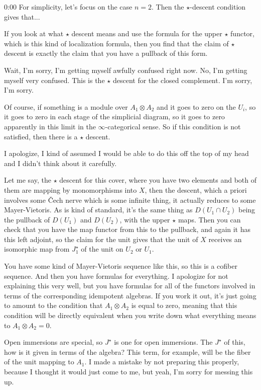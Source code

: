 \begin{unfinished}{0:00}
For simplicity, let's focus on the case $n=2$. Then the $\star$-descent condition gives that...


If you look at what $\star$ descent means and use the formula for the upper $\star$ functor, which is this kind of localization formula, then you find that the claim of $\star$ descent is exactly the claim that you have a pullback of this form.

Wait, I'm sorry, I'm getting myself awfully confused right now. No, I'm getting myself very confused. This is the $\star$ descent for the closed complement. I'm sorry, I'm sorry.

Of course, if something is a module over $A_1 \otimes A_2$ and it goes to zero on the $U_i$, so it goes to zero in each stage of the simplicial diagram, so it goes to zero apparently in this limit in the $\infty$-categorical sense. So if this condition is not satisfied, then there is a $\star$ descent.

I apologize, I kind of assumed I would be able to do this off the top of my head and I didn't think about it carefully. 

Let me say, the $\star$ descent for this cover, where you have two elements and both of them are mapping by monomorphisms into $X$, then the descent, which a priori involves some Čech nerve which is some infinite thing, it actually reduces to some Mayer-Vietoris. As is kind of standard, it's the same thing as $D(U_1 \cap U_2)$ being the pullback of $D(U_1)$ and $D(U_2)$, with the upper $\star$ maps. Then you can check that you have the map functor from this to the pullback, and again it has this left adjoint, so the claim for the unit gives that the unit of $X$ receives an isomorphic map from $J_1^{\star}$ of the unit on $U_2$ or $U_1$.

You have some kind of Mayer-Vietoris sequence like this, so this is a cofiber sequence. And then you have formulas for everything. I apologize for not explaining this very well, but you have formulas for all of the functors involved in terms of the corresponding idempotent algebras. If you work it out, it's just going to amount to the condition that $A_1 \otimes A_2$ is equal to zero, meaning that this condition will be directly equivalent when you write down what everything means to $A_1 \otimes A_2 = 0$. 

Open immersions are special, so $J^{\star}$ is one for open immersions. The $J^{\star}$ of this, how is it given in terms of the algebra? This term, for example, will be the fiber of the unit mapping to $A_1$. I made a mistake by not preparing this properly, because I thought it would just come to me, but yeah, I'm sorry for messing this up.


\end{unfinished}
